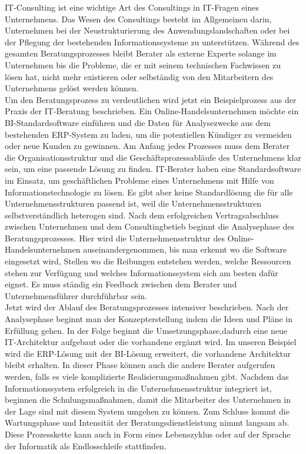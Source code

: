 	IT-Consulting ist eine wichtige Art des Consultings in IT-Fragen eines Unternehmens. Das Wesen des Consultings besteht im Allgemeinen darin, Unternehmen bei der Neustrukturierung des Anwendungslandschaften oder bei der Pflegung der bestehenden Informationssysteme zu unterstützen. Während des gesamten Beratungsprozesses bleibt Berater als externe Experte solange im Unternehmen bis die Probleme, die er mit seinem technischen Fachwissen zu lösen hat, nicht mehr existieren oder selbständig von den Mitarbeitern des Unternehmens gelöst werden können.\\
	Um den Beratungsprozess zu verdeutlichen wird jetzt ein Beispielprozess aus der Praxis der IT-Beratung beschrieben. Ein Online-Handelsunternehmen möchte ein BI-Standardsoftware einführen und die Daten für Analysezwecke aus dem bestehenden ERP-System zu laden, um die potentiellen Kündiger zu vermeiden oder neue Kunden zu gewinnen. Am Anfang jedes Prozesses muss dem Berater die Organisationsstruktur und die Geschäftsprozessabläufe des Unternehmens klar sein, um eine passende Lösung zu finden. IT-Berater haben eine Standardsoftware im Einsatz, um geschäftlichen Probleme eines Unternehmens mit Hilfe von Informationstechnologie zu lösen. Es gibt aber keine Standardlösung die für alle Unternehmensstrukturen passend ist, weil die Unternehmensstrukturen selbstverständlich heterogen sind. Nach dem erfolgreichen Vertragsabschluss zwischen Unternehmen und dem Consultingbetieb beginnt die Analysephase des Beratungsprozesses. Hier wird die Unternehmensstruktur des Online-Handelsunternehmen auseinandergenommen, bis man erkennt wo die Software eingesetzt wird, Stellen wo die Reibungen entstehen werden, welche Ressourcen stehen zur Verfügung und welches Informationssystem sich am besten dafür eignet. Es muss ständig ein Feedback zwischen dem Berater und Unternehmensführer durchführbar sein.\\
	Jetzt wird der Ablauf des Beratungsprozesses intensiver beschrieben. Nach der Analysephase beginnt man der Konzepterstellung indem die Ideen und Pläne in Erfüllung gehen. In der Folge beginnt die Umsetzungsphase,dadurch eine neue IT-Architektur aufgebaut oder die vorhandene ergänzt wird. Im unseren Beispiel wird die ERP-Lösung mit der BI-Lösung erweitert, die vorhandene Architektur bleibt erhalten. In dieser Phase können auch die andere Berater aufgerufen werden, falls es viele komplizierte Realisierungsmaßnahmen gibt.
	Nachdem das Informationssystem erfolgreich in die Unternehmensstruktur integriert ist, beginnen die Schulungsmaßnahmen, damit die Mitarbeiter des Unternehmen in der Lage sind mit diesem System umgehen zu können. Zum Schluss kommt die Wartungsphase und Intensität der Beratungsdienstleistung nimmt langsam ab. Diese Prozesskette kann auch in Form eines Lebenszyklus oder auf der Sprache der Informatik als Endlosschleife  stattfinden.\\
